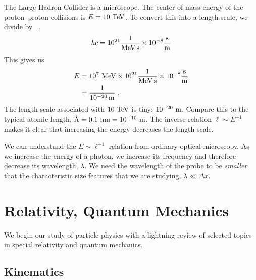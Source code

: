 \documentclass[12pt, oneside]{report}    %
\let\oldsection\section
\def\section{%
  \setcounter{sidenote}{1}%
  \oldsection
}
\begin{document}
\begin{example}
The Large Hadron Collider is a microscope. The center of mass energy of the proton--proton collisions is $E = 10~\textnormal{TeV}$. To convert this into a length scale, we divide by \ .
\begin{align}
    \hbar c = 10^{21}\frac{1}{\textnormal{MeV}\,\textnormal{s}} \times 10^{-8} \frac{\textnormal{s}}{\textnormal{m}}
\end{align}
This gives us
\begin{align}
    E &= 10^7~\textnormal{MeV} \times 10^{21}\frac{1}{\textnormal{MeV}\,\textnormal{s}} \times 10^{-8} \frac{\textnormal{s}}{\textnormal{m}}
    \\
    &= \frac{1}{10^{-20}\,\textnormal{m}} \ .
\end{align}
The length scale associated with $10~\textnormal{TeV}$ is tiny: $10^{-20}~\textnormal{m}$. Compare this to the typical atomic length, $\text{\AA} = 0.1~\textnormal{nm} = 10^{-10}~\textnormal{m}$. The inverse relation $\ell \sim E^{-1}$ makes it clear that increasing the energy decreases the length scale. 
\end{example}

We can understand the $E \sim \ell^{-1}$ relation from ordinary optical microscopy. As we increase the energy of a photon, we increase its frequency and therefore decrease its wavelength, $\lambda$. We need the wavelength of the probe to be \emph{smaller} that the characteristic size features that we are studying, $\lambda \ll \Delta x$. 





\chapter{Relativity, Quantum Mechanics}

We begin our study of particle physics with a lightning review of selected topics in special relativity and quantum mechanics.

\section{Kinematics}
\end{document}
